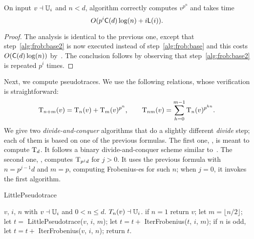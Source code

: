 \begin{theorem}
  \label{th:l-ifrob}
  On input $v\dashv\mathbb{U}_i$ and $n<d$, algorithm 
  correctly computes $v^{p^n}$ and takes time 
  \begin{equation}
    \label{eq:94}
    O(p^i\mathsf{C}(d)\log (n) + i\mathsf{L}(i))
    \text{.}    
  \end{equation}
\end{theorem}
\begin{proof}
  The analysis is identical to the previous one, except that
  step~\ref{alg:frob:base2} is now executed instead of
  step~\ref{alg:frob:base} and this costs $O(\mathsf{C}(d)\log (n))$
  by~\todo\cite[Lemma 5.3]{vzGS92}. The conclusion follows by observing
  that step~\ref{alg:frob:base2} is repeated $p^i$ times. 
\end{proof}

Next, we compute pseudotraces. We use the following relations, whose
verification is straightforward:
\begin{equation}
  \operatorname{T}_{n+m}(v) =
  \operatorname{T}_{n}(v) + \operatorname{T}_{m}(v)^{p^n}
  \text{,}\qquad
  \operatorname{T}_{nm}(v) =
  \sum_{h=0}^{m-1}\operatorname{T}_{n}(v)^{p^{hn}}
  \text{.}
\end{equation}
We give two \emph{divide-and-conquer} algorithms that do a slightly
different \emph{divide} step; each of them is based on one of the
previous formulas. The first one, , is meant to
compute $\operatorname{T}_d$. It follows a binary divide-and-conquer scheme
similar to~\todo\cite[Algorithm~5.2]{vzGS92}. The second one,
, computes $\operatorname{T}_{p^jd}$ for $j>0$. It uses the
previous formula with $n=p^{j-1}d$ and $m=p$, computing Frobenius-es
for such $n$; when $j=0$, it invokes the first algorithm.


\begin{algorithm}
  \caption{LittlePseudotrace}
  \begin{algorithmic}[1]
    \REQUIRE $v$, $i$, $n$ with $v\dashv\mathbb{U}_i$ and $0<n\le d$.
    \ENSURE $T_{n}(v) \dashv \mathbb{U}_i$.
    \STATE \label{alg:lpseudo:base} if $n = 1$ return $v$;
    \STATE \label{alg:lpseudo:half} let $m = \lfloor n/2 \rfloor$;
    \STATE \label{alg:lpseudo:rec} let $t=$ {\sf LittlePseudotrace}($v$,
    $i$, $m$);
    \STATE \label{alg:lpseudo:frob} let $t=t+$ {\sf IterFrobenius}($t$, $i$, $m$);
    \STATE \label{alg:lpseudo:odd} if $n$ is odd, let $t=t+$ {\sf
      IterFrobenius}($v$, $i$, $n$);
    \STATE return $t$.
  \end{algorithmic}
\end{algorithm}

